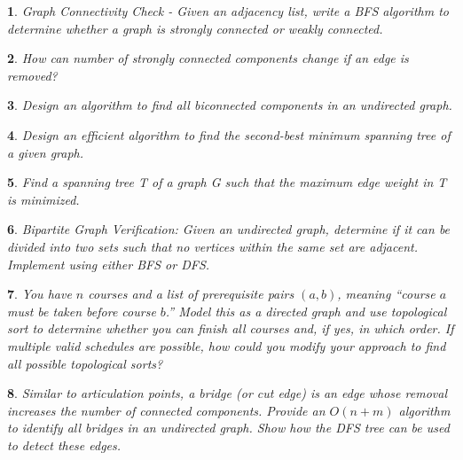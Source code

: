 \documentclass[%
addpoints]{exam}
\theoremstyle{problem}
\newtheorem{p}{}
\begin{document}
\begin{p}
Graph Connectivity Check - Given an adjacency list, write a BFS algorithm to determine whether a graph is strongly connected or weakly connected.
\hfill\end{p}


\begin{p}
How can number of strongly connected components change if an edge is removed?
\hfill\end{p}

\begin{p}
Design an algorithm to find all biconnected components in an undirected graph.
\hfill\end{p}

\begin{p}

Design an efficient algorithm to find the second-best minimum spanning tree of a given graph.
\hfill\end{p}

\begin{p}

Find a spanning tree T of a graph G such that the maximum edge weight in T is minimized.
\hfill\end{p}

\begin{p}

Bipartite Graph Verification: Given an undirected graph, determine if it can be divided into
two sets such that no vertices within the same set are adjacent. Implement using either BFS or DFS.
\hfill\end{p}

\begin{p}
You have \( n \) courses and a list of prerequisite pairs \((a, b)\), meaning ``course \(a\) must be taken before course \(b\).'' Model this as a directed graph and use topological sort to determine whether you can finish all courses and, if yes, in which order.
If multiple valid schedules are possible, how could you modify your approach to find \emph{all} possible topological sorts?
\hfill\end{p}

\begin{p}
Similar to articulation points, a \emph{bridge} (or cut edge) is an edge whose removal increases the number of connected components. Provide an \(O(n + m)\) algorithm to identify all bridges in an undirected graph. Show how the DFS tree can be used to detect these edges.
\hfill\end{p}
\end{document}
